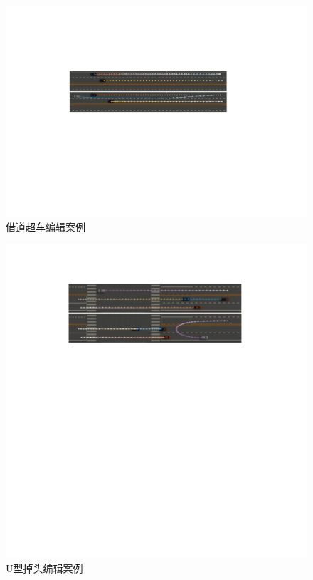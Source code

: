 \begin{figure}[!tbh]
\centering
\includegraphics[width=\columnwidth]{figure/traedits/editing nudge 2.pdf}
\caption[借道超车编辑案例]{
借道超车编辑案例
}
\label{fig:traedits_editnudge}
\end{figure}

\begin{figure}[!tbh]
\centering
\includegraphics[width=\columnwidth]{figure/traedits/editing u-turn 5.pdf}
\caption[U型掉头编辑案例]{
U型掉头编辑案例
}
\label{fig:traedits_edituturn}
\end{figure}




